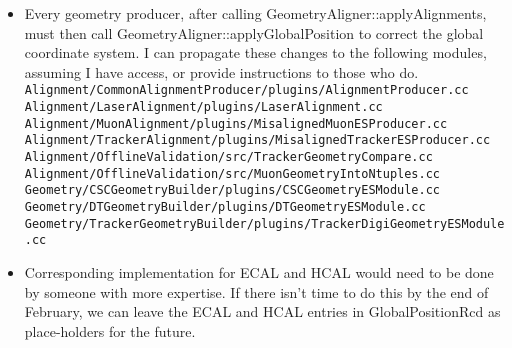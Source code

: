 \documentclass[compress]{beamer}
\begin{document}
\begin{frame}
\begin{itemize}\setlength{\itemsep}{0.25 cm}
\item Every geometry producer, after calling GeometryAligner::applyAlignments, must then call GeometryAligner::applyGlobalPosition to correct the global coordinate system.  I can propagate these changes to the following modules, assuming I have access, or provide instructions to those who do.
{\tt \scriptsize
Alignment/CommonAlignmentProducer/plugins/AlignmentProducer.cc \\
Alignment/LaserAlignment/plugins/LaserAlignment.cc \\
Alignment/MuonAlignment/plugins/MisalignedMuonESProducer.cc \\
Alignment/TrackerAlignment/plugins/MisalignedTrackerESProducer.cc \\
Alignment/OfflineValidation/src/TrackerGeometryCompare.cc \\
Alignment/OfflineValidation/src/MuonGeometryIntoNtuples.cc \\
Geometry/CSCGeometryBuilder/plugins/CSCGeometryESModule.cc \\
Geometry/DTGeometryBuilder/plugins/DTGeometryESModule.cc \\
Geometry/TrackerGeometryBuilder/plugins/TrackerDigiGeometryESModule.cc \\
}

\item Corresponding implementation for ECAL and HCAL would need to be done by someone with more expertise.  If there isn't time to do this by the end of February, we can leave the ECAL and HCAL entries in GlobalPositionRcd as place-holders for the future. 
\end{itemize}
\label{numpages}

\end{frame}
\end{document}
